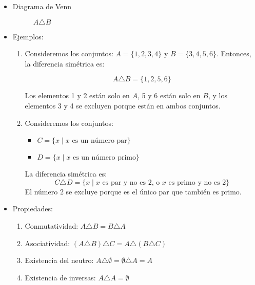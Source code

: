 \begin{itemize}
	\item Diagrama de Venn
		\begin{figure}[H]
			\centering
			\begin{venndiagram2sets}
				\fillOnlyA \fillOnlyB
			\end{venndiagram2sets}
			\caption*{$A \triangle B$}
		\end{figure}
	
	\item Ejemplos:
	\begin{enumerate}
		\item Consideremos los conjuntos: \(A = \{1, 2, 3, 4\}\) y \(B = \{3, 4, 5, 6\}\). Entonces, la diferencia simétrica es:
		
		$$A \triangle B = \{1, 2, 5, 6\}$$
		
		Los elementos 1 y 2 están solo en \(A\), 5 y 6 están solo en \(B\), y los elementos 3 y 4 se excluyen porque están en ambos conjuntos.
		
		\item Consideremos los conjuntos:
		\begin{itemize}
			\item \(C = \{x \mid x \mbox{ es un número par}\}\)
			\item \(D = \{x \mid x \mbox{ es un número primo}\}\)
		\end{itemize}
		
		La diferencia simétrica es:
		$$C \triangle D = \{x \mid x \text{ es par y no es 2, o } x \text{ es primo y no es 2}\}$$
		El número 2 se excluye porque es el único par que también es primo.
	\end{enumerate}
	
	\item Propiedades:
	\begin{enumerate}[label=\roman*)]
		\item Conmutatividad: \(A \triangle B = B \triangle A\)
		\item Asociatividad: \((A \triangle B) \triangle C = A \triangle (B \triangle C)\)
		\item Existencia del neutro: \( A \triangle \emptyset = \emptyset \triangle A = A \)
		\item Existencia de inversas: \( A \triangle A = \emptyset \)
	\end{enumerate}
\end{itemize}


